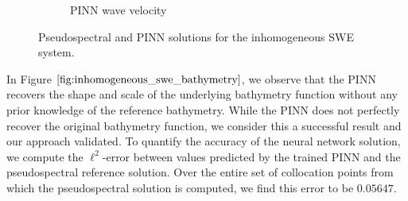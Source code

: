 \begin{figure}[h]
\begin{subfigure}[b]{0.45\textwidth}
        \caption{PINN wave velocity}
        \label{fig:inhomogeneous_pinn_swe_velocity}
    \end{subfigure}
    \caption{Pseudospectral and PINN solutions for the inhomogeneous SWE system.}
    \label{fig:inhomogeneous_swe_velocity}
\end{figure}

In Figure $\ref*{fig:inhomogeneous_swe_bathymetry}$, we observe that the PINN recovers the shape and scale of the 
underlying bathymetry function without any prior knowledge of the reference bathymetry. While the PINN does not 
perfectly recover the original bathymetry function, we consider this a successful result and our approach validated. 
To quantify the accuracy of the neural network solution, we compute the $\ell^2$-error between values predicted by the 
trained PINN and the pseudospectral reference solution. Over the entire set of collocation points from which the 
pseudospectral solution is computed, we find this error to be $0.05647$.

